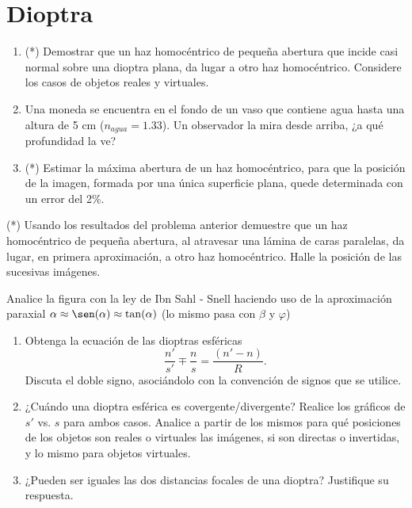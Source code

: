 \section*{Dioptra}

\item 
\begin{enumerate}
	\item (*) Demostrar que un haz homocéntrico de pequeña abertura que incide casi normal sobre una dioptra plana, da lugar a otro haz homocéntrico.
	Considere los casos de objetos reales y virtuales.
	\item Una moneda se encuentra en el fondo de un vaso que contiene agua hasta una altura de 5 cm ($n_{agua}=1.33$).
	Un observador la mira desde arriba, ¿a qué profundidad la ve?
	\item (*) Estimar la máxima abertura de un haz homocéntrico, para que la posición de la imagen, formada por una única superficie plana, quede determinada con un error del 2\%. 
\end{enumerate}


\item (*) Usando los resultados del problema anterior demuestre que un haz homocéntrico de pequeña abertura, al atravesar una lámina de caras paralelas, da lugar, en primera aproximación, a otro haz homocéntrico.
Halle la posición de las sucesivas imágenes. 


\item
\begin{minipage}[t][1.4cm]{0.55\textwidth}
	Analice la figura con la ley de Ibn Sahl - Snell haciendo uso de la aproximación paraxial $\alpha \approx \sen( \alpha ) \approx \tan( \alpha )$ (lo mismo pasa con $\beta$ y $\varphi$) 
\end{minipage}
\begin{minipage}[c][0.4cm][t]{0.4\textwidth}
	
\end{minipage}
\begin{enumerate}
	\item
	Obtenga la ecuación de las dioptras esféricas
	\[
		\frac{n'}{s'}\mp\frac{n}{s}=\frac{(n'-n)}{R} .
	\]
	Discuta el doble signo, asociándolo con la convención de signos que se utilice.
	\item ¿Cuándo una dioptra esférica es covergente/divergente? 
	Realice los gráficos de $s'$ vs. $s$ para ambos casos.
	Analice a partir de los mismos para qué posiciones de los objetos son reales o virtuales las imágenes, si son directas o invertidas, y lo mismo para objetos virtuales.
	\item ¿Pueden ser iguales las dos distancias focales de una dioptra?
	Justifique su respuesta.
\end{enumerate}
